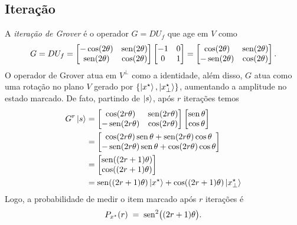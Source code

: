 \subsection{Iteração}\label{subsec:go}
A \emph{iteração de Grover} é o operador $G=DU_f$ que age em $V$ como
\begin{equation}
G = DU_f = \begin{bmatrix}
    -\cos(2\theta) & \operatorname{sen}(2\theta) \\
    \operatorname{sen}(2\theta) & \cos(2\theta)
\end{bmatrix} \begin{bmatrix}
    -1 & 0 \\
     0 & 1
\end{bmatrix} = \begin{bmatrix}
    \cos(2\theta) & \operatorname{sen}(2\theta) \\
    -\operatorname{sen}(2\theta) & \cos(2\theta)
\end{bmatrix}.
\end{equation}
O operador de Grover atua em $V^\perp$ como a identidade, além disso, $G$ atua como uma rotação no plano $V$ gerado por $\{\ket{x^\star},\ket{x^{\star}_\perp}\}$, aumentando a amplitude no estado marcado. De fato, partindo de $\ket{s}$, após $r$ iterações temos
\begin{align}
    G^r\ket{s} &= \begin{bmatrix}
        \cos(2r\theta) & \operatorname{sen}(2r\theta) \\
        -\operatorname{sen}(2r\theta) & \cos(2r\theta)
    \end{bmatrix} \begin{bmatrix}
        \operatorname{sen} \theta \\
        \cos \theta
    \end{bmatrix} \\
            &= \begin{bmatrix}
                \cos(2r\theta)\operatorname{sen}\theta + \operatorname{sen}(2r\theta)\cos\theta \\
                -\operatorname{sen}(2r\theta)\operatorname{sen}\theta + \cos(2r\theta)\cos\theta
            \end{bmatrix} \\
            &=\begin{bmatrix}
                \operatorname{sen}((2r+1)\theta) \\
                \cos((2r+1)\theta) \\
            \end{bmatrix} \\
            &= \operatorname{sen}((2r+1)\theta)\ket{x^\star} + \cos((2r+1)\theta)\ket{x^\star_\perp}
\end{align}
Logo, a probabilidade de medir o item marcado após $r$ iterações é
\begin{equation}
P_{x^\star}(r) \;=\; \operatorname{sen}^2\bigl((2r+1)\theta\bigr).
\end{equation}

